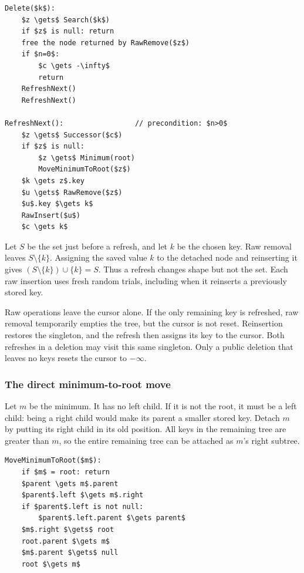 \documentclass[11pt,a4paper]{article}
\theoremstyle{readable}
\begin{document}
\noindent\begin{minipage}{\linewidth}
\begin{lstlisting}[caption={A public deletion and one step of its refresh schedule.}]
Delete($k$):
    $z \gets$ Search($k$)
    if $z$ is null: return
    free the node returned by RawRemove($z$)
    if $n=0$:
        $c \gets -\infty$
        return
    RefreshNext()
    RefreshNext()

RefreshNext():                 // precondition: $n>0$
    $z \gets$ Successor($c$)
    if $z$ is null:
        $z \gets$ Minimum(root)
        MoveMinimumToRoot($z$)
    $k \gets z$.key
    $u \gets$ RawRemove($z$)
    $u$.key $\gets k$
    RawInsert($u$)
    $c \gets k$
\end{lstlisting}
\end{minipage}

Let $S$ be the set just before a refresh, and let $k$ be the chosen key.
Raw removal leaves $S\setminus\{k\}$. Assigning the saved value $k$
to the detached node and reinserting it gives
$(S\setminus\{k\})\cup\{k\}=S$. Thus a refresh changes shape but
not the set. Each raw insertion uses fresh random trials, including
when it reinserts a previously stored key.

Raw operations leave the cursor alone. If the only remaining key is
refreshed, raw removal temporarily empties the tree, but the cursor is
not reset. Reinsertion restores the singleton, and the refresh then
assigns its key to the cursor. Both refreshes in a deletion may visit
this same singleton. Only a public deletion that leaves no keys resets
the cursor to $-\infty$.

\subsubsection*{The direct minimum-to-root move}
Let $m$ be the minimum. It has no left child. If it is not the root,
it must be a left child: being a right child would make its parent a
smaller stored key. Detach $m$ by putting its right child in its old
position. All keys in the remaining tree are greater than $m$, so the
entire remaining tree can be attached as $m$'s right subtree.

\noindent\begin{minipage}{\linewidth}
\begin{lstlisting}[caption={Moving the minimum without a chain of rotations.}]
MoveMinimumToRoot($m$):
    if $m$ = root: return
    $parent \gets m$.parent
    $parent$.left $\gets m$.right
    if $parent$.left is not null:
        $parent$.left.parent $\gets parent$
    $m$.right $\gets$ root
    root.parent $\gets m$
    $m$.parent $\gets$ null
    root $\gets m$
\end{lstlisting}
\end{minipage}
\end{document}
